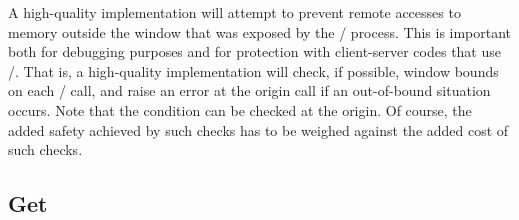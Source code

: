 \begin{implementors}
A high-quality 
implementation will attempt to
prevent remote accesses to memory outside the
window that was exposed by the \mpi/ process.
This is important both for debugging
purposes and for protection with client-server codes that use \RMA/.
That is,
a high-quality implementation will check, if possible,
window bounds on each \RMA/ call,
and raise an error at the origin call if an out-of-bound
situation occurs.
Note that the condition can be checked at the origin.
Of course, the added safety achieved by such checks has to be weighed
against the added cost of such checks.
\end{implementors}

\subsection{Get}
\label{sec:onesided-get}


